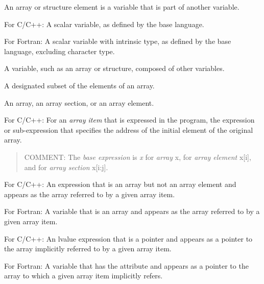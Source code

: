 \begin{adjustwidth}{-0.75in}{0in}
\begin{note}
An array or structure element is a variable that is part of another variable.
\end{note}
\end{adjustwidth}
\glossarydefend

\glossarydefstart
For C/C++:
\nopagebreak
A scalar variable, as defined by the base language.

For Fortran:
\nopagebreak
A scalar variable with intrinsic type, as defined by the base language,
excluding character type.
\glossarydefend

\glossarydefstart
A variable, such as an array or structure, composed of other variables.
\glossarydefend

\glossarydefstart
A designated subset of the elements of an array.
\glossarydefend

\glossarydefstart
An array, an array section, or an array element.
\glossarydefend

\glossarydefstart
For C/C++: For an \emph{array item} that is expressed in the program, the expression
or sub-expression that specifies the address of the initial element
of the original array.

\begin{quote}
COMMENT: The \emph{base expression} is \emph{x} for \emph{array} x, for \emph{array
element} x[i], and for \emph{array section} x[i:j].
\end{quote}
\glossarydefend

\glossarydefstart
For C/C++:
\nopagebreak
An expression that is an array but not an array element and appears as the
array referred to by a given array item.

For Fortran:
\nopagebreak
A variable that is an array and appears as the array referred to by a given
array item.
\glossarydefend

\glossarydefstart
For C/C++:
\nopagebreak
An lvalue expression that is a pointer and appears as a pointer to the array
implicitly referred to by a given array item.

For Fortran:
\nopagebreak
A variable that has the  attribute and appears as a pointer to
the array to which a given array item implicitly refers.

